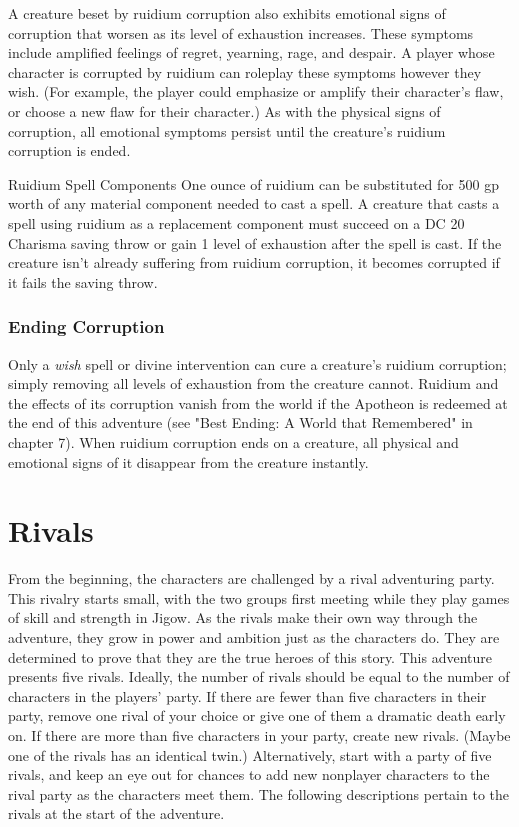 \documentclass[10pt,a4,twoside,twocolumn,openany,nodeprecatedcode]{dndbook}
\begin{document}
A creature beset by ruidium corruption also exhibits emotional signs of corruption that worsen as its level of exhaustion increases. These symptoms include amplified feelings of regret, yearning, rage, and despair. A player whose character is corrupted by ruidium can roleplay these symptoms however they wish. (For example, the player could emphasize or amplify their character's flaw, or choose a new flaw for their character.) As with the physical signs of corruption, all emotional symptoms persist until the creature's ruidium corruption is ended.
\begin{DndComment}{Ruidium Spell Components}
One ounce of ruidium can be substituted for 500 gp worth of any material component needed to cast a spell. A creature that casts a spell using ruidium as a replacement component must succeed on a DC 20 Charisma saving throw or gain 1 level of exhaustion after the spell is cast. If the creature isn't already suffering from ruidium corruption, it becomes corrupted if it fails the saving throw.
\end{DndComment}

\subsubsection{Ending Corruption}
Only a \textit{wish} spell or divine intervention can cure a creature's ruidium corruption; simply removing all levels of exhaustion from the creature cannot.
Ruidium and the effects of its corruption vanish from the world if the Apotheon is redeemed at the end of this adventure (see "Best Ending: A World that Remembered" in chapter 7).
When ruidium corruption ends on a creature, all physical and emotional signs of it disappear from the creature instantly.
\section{Rivals}
From the beginning, the characters are challenged by a rival adventuring party. This rivalry starts small, with the two groups first meeting while they play games of skill and strength in Jigow. As the rivals make their own way through the adventure, they grow in power and ambition just as the characters do. They are determined to prove that they are the true heroes of this story.
This adventure presents five rivals. Ideally, the number of rivals should be equal to the number of characters in the players' party. If there are fewer than five characters in their party, remove one rival of your choice or give one of them a dramatic death early on. If there are more than five characters in your party, create new rivals. (Maybe one of the rivals has an identical twin.) Alternatively, start with a party of five rivals, and keep an eye out for chances to add new nonplayer characters to the rival party as the characters meet them.
The following descriptions pertain to the rivals at the start of the adventure.
\end{document}
